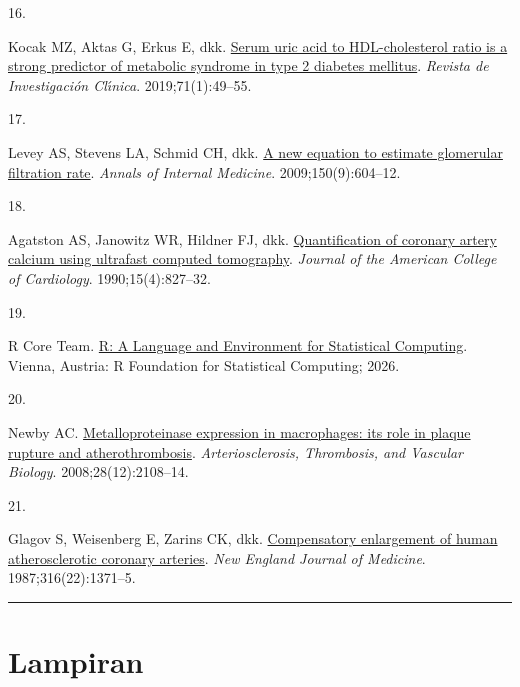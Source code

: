 \documentclass[
  indonesian,
]{agujournal2019}
\newlength{\cslhangindent}
\newlength{\csllabelwidth}
\newenvironment{CSLReferences}[2] %
 {\begin{list}{}{%
  \setlength{\itemindent}{0pt}
  \setlength{\leftmargin}{0pt}
  \setlength{\parsep}{0pt}
  \ifodd #1
   \setlength{\leftmargin}{\cslhangindent}
   \setlength{\itemindent}{-1\cslhangindent}
  \fi
  \setlength{\itemsep}{#2\baselineskip}}}
 {\end{list}}
\newcommand{\CSLLeftMargin}[1]{\parbox[t]{\csllabelwidth}{\strut#1\strut}}
\newcommand{\CSLRightInline}[1]{\parbox[t]{\linewidth - \csllabelwidth}{\strut#1\strut}}
\begin{document}
\begin{CSLReferences}{0}{1}
\CSLLeftMargin{16. }%
\CSLRightInline{Kocak MZ, Aktas G, Erkus E, dkk.
\href{https://doi.org/10.24875/RIC.18002628}{Serum uric acid to
HDL-cholesterol ratio is a strong predictor of metabolic syndrome in
type 2 diabetes mellitus}. \emph{Revista de Investigaci{ó}n Cl{ı́}nica}.
2019;71(1):49--55. }

\CSLLeftMargin{17. }%
\CSLRightInline{{Levey AS, Stevens LA, Schmid CH, dkk.}
\href{https://doi.org/10.7326/0003-4819-150-9-200905050-00006}{A new
equation to estimate glomerular filtration rate}. \emph{Annals of
Internal Medicine}. 2009;150(9):604--12. }

\CSLLeftMargin{18. }%
\CSLRightInline{Agatston AS, Janowitz WR, Hildner FJ, dkk.
\href{https://doi.org/10.1016/0735-1097(90)90282-T}{Quantification of
coronary artery calcium using ultrafast computed tomography}.
\emph{Journal of the American College of Cardiology}.
1990;15(4):827--32. }

\CSLLeftMargin{19. }%
\CSLRightInline{R Core Team. \href{https://www.R-project.org/}{R: A
Language and Environment for Statistical Computing}. Vienna, Austria: R
Foundation for Statistical Computing; 2026. }

\CSLLeftMargin{20. }%
\CSLRightInline{Newby AC.
\href{https://doi.org/10.1161/ATVBAHA.108.173898}{Metalloproteinase
expression in macrophages: its role in plaque rupture and
atherothrombosis}. \emph{Arteriosclerosis, Thrombosis, and Vascular
Biology}. 2008;28(12):2108--14. }

\CSLLeftMargin{21. }%
\CSLRightInline{Glagov S, Weisenberg E, Zarins CK, dkk.
\href{https://doi.org/10.1056/NEJM198705283162204}{Compensatory
enlargement of human atherosclerotic coronary arteries}. \emph{New
England Journal of Medicine}. 1987;316(22):1371--5. }

\end{CSLReferences}

\begin{center}\rule{0.5\linewidth}{0.5pt}\end{center}

\section{Lampiran}\label{lampiran}
\end{document}
